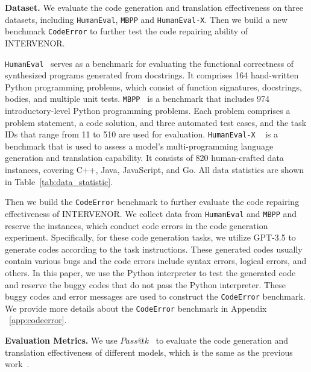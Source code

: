 \documentclass[11pt]{article}
\begin{document}
%
 \textbf{Dataset.} We evaluate the code generation and translation effectiveness on three datasets, including \texttt{HumanEval}, \texttt{MBPP} and \texttt{HumanEval-X}. Then we build a new benchmark \texttt{CodeError} to further test the code repairing ability of INTERVENOR.

\texttt{HumanEval}~\cite{chen2021evaluating} serves as a benchmark for evaluating the functional correctness of synthesized programs generated from docstrings. It comprises 164 hand-written Python programming problems, which consist of function signatures, docstrings, bodies, and multiple unit tests. \texttt{MBPP}~\cite{austin2021program} is a benchmark that includes 974 introductory-level Python programming problems. Each problem comprises a problem statement, a code solution, and three automated test cases, and the task IDs that range from 11 to 510 are used for evaluation.
\texttt{HumanEval-X} ~\cite{zheng2023codegeex} is a benchmark that is used to assess a model's multi-programming language generation and translation capability. It consists of 820 human-crafted data instances, covering C++, Java, JavaScript, and Go. All data statistics are shown in Table~\ref{tab:data_statistic}. 

Then we build the \texttt{CodeError} benchmark to further evaluate the code repairing effectiveness of INTERVENOR. We collect data from \texttt{HumanEval} and \texttt{MBPP} and reserve the instances, which conduct code errors in the code generation experiment. Specifically, for these code generation tasks, we utilize GPT-3.5 to generate codes according to the task instructions. These generated codes usually contain various bugs and the code errors include syntax errors, logical errors, and others. In this paper, we use the Python interpreter to test the generated code and reserve the buggy codes that do not pass the Python interpreter. These buggy codes and error messages are used to construct the \texttt{CodeError} benchmark. We provide more details about the \texttt{CodeError} benchmark in Appendix ~\ref{app:codeerror}.





\textbf{Evaluation Metrics. } We use $Pass@k$~\cite{chen2021evaluating} to evaluate the code generation and translation effectiveness of different models, which is the same as the previous work~\cite{chen2021evaluating,zheng2023codegeex,li2023structured,chen2022codet,nijkamp2022codegen}.
\end{document}
